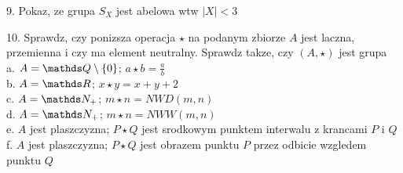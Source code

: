 \documentclass{article}[13pt]
\begin{document}
    9. Pokaz, ze grupa $S_X$ jest abelowa wtw $|X|<3$
    \medskip

    10. Sprawdz, czy ponizsza operacja $\star$ na podanym zbiorze $A$ jest laczna, przemienna i czy ma element neutralny. Sprawdz takze, czy $(A, \star)$ jest grupa\\
        \indent a. $A=\Q\setminus\{0\}$; $a\star b=\frac ab$\\
        \indent b. $A=\R$; $x\star y=x+y+2$\\
        \indent c. $A=\N_+$; $m\star n =NWD(m,n)$\\
        \indent d. $A=\N_+$; $m\star n=NWW(m,n)$\\
        \indent e. $A$ jest plaszczyzna; $P\star Q$ jest srodkowym punktem interwalu z krancami $P$ i $Q$\\
        \indent f. $A$ jest plaszczyzna; $P\star Q$ jest obrazem punktu $P$ przez odbicie wzgledem punktu $Q$ 
\end{document}
